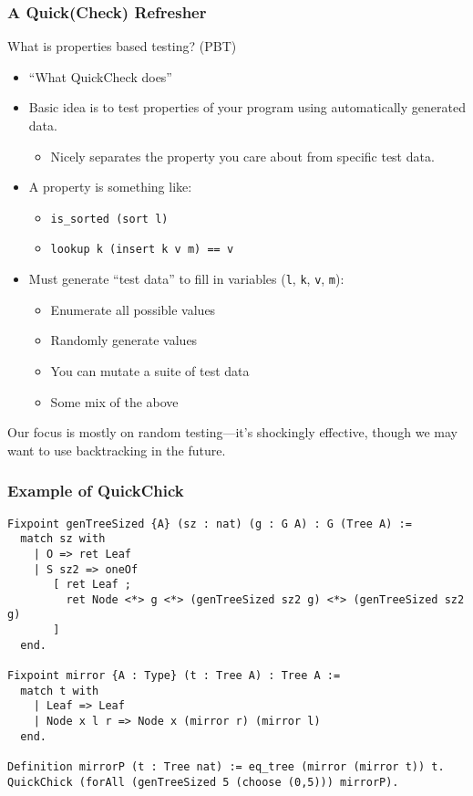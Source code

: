 \documentclass{beamer}
\begin{document}
\begin{frame}
  \frametitle{A Quick(Check) Refresher}

  What is properties based testing? (PBT)

  \begin{itemize}
  \item ``What QuickCheck does''
  \item Basic idea is to test properties of your program using
    automatically generated data.
    \begin{itemize}
    \item Nicely separates the property you care about from specific
      test data.
    \end{itemize}
  \item A property is something like:
    \begin{itemize}
    \item {\tt is\_sorted (sort l)}
    \item {\tt lookup k (insert k v m) == v}
    \end{itemize}
  \item Must generate ``test data'' to fill in variables ({\tt l}, {\tt k}, {\tt v}, {\tt m}):
    \begin{itemize}
    \item Enumerate all possible values
    \item Randomly generate values
    \item You can mutate a suite of test data~\cite{10.1145/3360607}
    \item Some mix of the above
    \end{itemize}
  \end{itemize}
  
  \pause
  
  Our focus is mostly on random testing---it's shockingly effective,
  though we may want to use backtracking in the future.
\end{frame}

\begin{frame}[fragile]
  \frametitle{Example of QuickChick}

\begin{lstlisting}[language=SSR]
Fixpoint genTreeSized {A} (sz : nat) (g : G A) : G (Tree A) :=
  match sz with
    | O => ret Leaf
    | S sz2 => oneOf
       [ ret Leaf ;
         ret Node <*> g <*> (genTreeSized sz2 g) <*> (genTreeSized sz2 g)
       ]
  end.

Fixpoint mirror {A : Type} (t : Tree A) : Tree A :=
  match t with
    | Leaf => Leaf
    | Node x l r => Node x (mirror r) (mirror l)
  end.

Definition mirrorP (t : Tree nat) := eq_tree (mirror (mirror t)) t.
QuickChick (forAll (genTreeSized 5 (choose (0,5))) mirrorP).
\end{lstlisting}
\end{frame}
\end{document}
